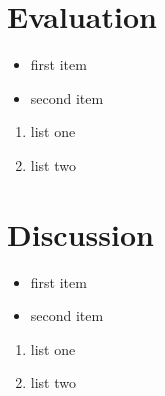 \documentclass{beamer}
\begin{document}
\section{Evaluation}
\begin{frame}
  \begin{itemize}
  \item first item
  \item second item
  \end{itemize}
  \begin{enumerate}
  \item list one
  \item list two
  \end{enumerate}
\end{frame}

\section{Discussion}
\begin{frame}
  \begin{itemize}
  \item first item
  \item second item
  \end{itemize}
  \begin{enumerate}
  \item list one
  \item list two
  \end{enumerate}
\end{frame}
\end{document}
